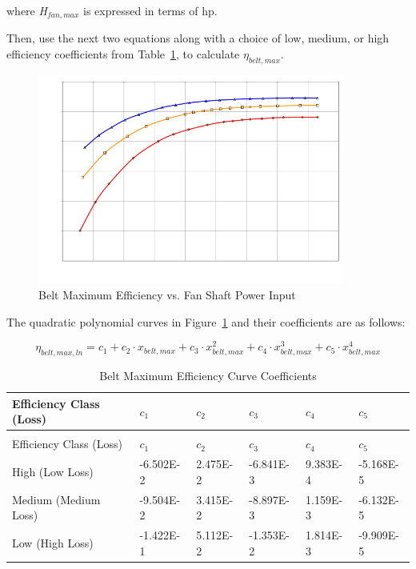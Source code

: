 where \emph{H\(_{fan,max}\)} is expressed in terms of hp.

Then, use the next two equations along with a choice of low, medium, or high efficiency coefficients from Table~\ref{table:belt-maximum-efficiency-curve-coefficients}, to calculate \(\eta_{belt,max}\).

\begin{figure}[hbtp] %
\centering
\includegraphics[width=0.9\textwidth, height=0.9\textheight, keepaspectratio=true]{media/image4907.svg.png}
\caption{Belt Maximum Efficiency vs. Fan Shaft Power Input \protect \label{fig:belt-maximum-efficiency-vs.-fan-shaft-power}}
\end{figure}

The quadratic polynomial curves in Figure~\ref{fig:belt-maximum-efficiency-vs.-fan-shaft-power} and their coefficients are as follows:

\begin{equation}
{\eta_{belt,max,ln}} = {c_1} + {c_2} \cdot {x_{belt,max}} + {c_3} \cdot x_{belt,max}^2 + {c_4} \cdot x_{belt,max}^3 + {c_5} \cdot x_{belt,max }^4
\end{equation}

\begin{longtable}[c]{p{1.0in}p{1.0in}p{1.0in}p{1.0in}p{1.0in}p{1.0in}}
\caption{Belt Maximum Efficiency Curve Coefficients \label{table:belt-maximum-efficiency-curve-coefficients}} \tabularnewline
\toprule 
Efficiency Class (Loss) & \(c_1\) & \(c_2\) & \(c_3\) & \(c_4\) & \(c_5\) \tabularnewline
\midrule
\endfirsthead

\caption[]{Belt Maximum Efficiency Curve Coefficients} \tabularnewline
\toprule 
Efficiency Class (Loss) & \(c_1\) & \(c_2\) & \(c_3\) & \(c_4\) & \(c_5\) \tabularnewline
\midrule
\endhead

High (Low Loss) & -6.502E-2 & 2.475E-2 & -6.841E-3 & 9.383E-4 & -5.168E-5 \tabularnewline
Medium (Medium Loss) & -9.504E-2 & 3.415E-2 & -8.897E-3 & 1.159E-3 & -6.132E-5 \tabularnewline
Low (High Loss) & -1.422E-1 & 5.112E-2 & -1.353E-2 & 1.814E-3 & -9.909E-5 \tabularnewline
\bottomrule
\end{longtable}

